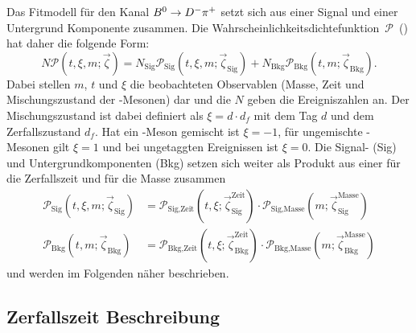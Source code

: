 Das Fitmodell für den Kanal ${{B}^0}\rightarrow{\ensuremath{{D}^-}}{\ensuremath{{\pi}^+}}$ setzt sich aus einer Signal und einer Untergrund Komponente zusammen. Die \mbox{Wahrscheinlichkeitsdichtefunktion $\mathcal{P}$ (\PDF)} hat daher die folgende Form:
\begin{equation}
N\mathcal{P}(t,\xi,m;\vec{\zeta})=N_\text{Sig}\mathcal{P}_\text{Sig}(t,\xi,m;\vec{\zeta}_\text{Sig})+N_\text{Bkg}\mathcal{P}_\text{Bkg}(t,m;\vec{\zeta}_\text{Bkg}).
\end{equation}
Dabei stellen $m$, $t$ und $\xi$ die beobachteten Observablen (Masse, Zeit und Mischungszustand der \Bz-Mesonen) dar und die $N$ geben die Ereigniszahlen an. Der Mischungszustand ist dabei definiert als $\xi=d\cdot d_f$ mit dem Tag $d$ und dem Zerfallszustand $d_f$. Hat ein \Bz-Meson gemischt ist $\xi=-1$, für ungemischte \Bz-Mesonen gilt $\xi=1$ und bei ungetaggten Ereignissen ist $\xi=0$. Die Signal- (Sig) und Untergrundkomponenten (Bkg) setzen sich weiter als Produkt aus einer \PDF für die Zerfallszeit und für die Masse zusammen
\begin{equation}
\begin{split}
\mathcal{P}_\text{Sig}(t,\xi,m;\vec{\zeta}_\text{Sig})&=\mathcal{P}_\text{Sig,Zeit}(t,\xi;\vec{\zeta}_\text{Sig}^\text{Zeit})\cdot\mathcal{P}_\text{Sig,Masse}(m;\vec{\zeta}_\text{Sig}^\text{Masse})\\
\mathcal{P}_\text{Bkg}(t,m;\vec{\zeta}_\text{Bkg})&=\mathcal{P}_\text{Bkg,Zeit}(t,\xi;\vec{\zeta}_\text{Bkg}^\text{Zeit})\cdot\mathcal{P}_\text{Bkg,Masse}(m;\vec{\zeta}_\text{Bkg}^\text{Masse})
\end{split}
\end{equation}
und werden im Folgenden näher beschrieben.

\subsection{Zerfallszeit Beschreibung}

